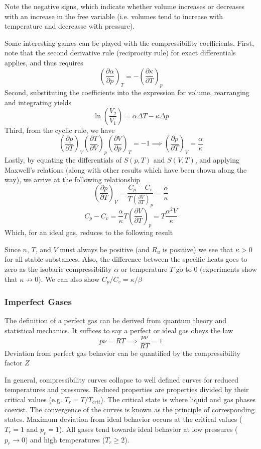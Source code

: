 \documentclass[11pt]{article}
\newcommand{\CenteredBoxed}[1]{\begin{center}\boxed{#1}\end{center}}
\newcommand{\Partial}[2]{\frac{\partial #1}{\partial #2}}
\newcommand{\PartialConst}[3]{\left(\Partial{#1}{#2}\right)_{#3}}
\begin{document}
Note the negative signs, which indicate whether volume increases or decreases with an increase in the free variable (i.e. volumes tend to increase with temperature and decreasse with pressure).

Some interesting games can be played with the compressibility coefficients. First, note that the second derivative rule (reciprocity rule) for exact differentials applies, and thus requires
$$\PartialConst{\alpha}{p}{T} = -\PartialConst{\kappa}{T}{p}$$
Second, substituting the coefficients into the expression for volume, rearranging and integrating yields
$$\ln\left(\frac{V_2}{V_1}\right) = \alpha\Delta T - \kappa\Delta p$$
Third, from the cyclic rule, we have
$$\PartialConst{p}{T}{V}\PartialConst{T}{V}{p}\PartialConst{V}{p}{T}=-1\implies\PartialConst{p}{T}{V}=\frac{\alpha}{\kappa}$$
Lastly, by equating the differentials of $S(p,T)$ and $S(V,T)$, and applying Maxwell's relations (along with other results which have been shown along the way), we arrive at the following relationship
$$\PartialConst{p}{T}{V} = \frac{C_p-C_v}{T\PartialConst{V}{T}{p}} = \frac{\alpha}{\kappa}$$
$$C_p - C_v  = \frac{\alpha}{\kappa}T\PartialConst{V}{T}{p}=T\frac{\alpha^2V}{\kappa}$$
Which, for an ideal gas, reduces to the following result
\CenteredBoxed{C_p - C_v = \frac{pV}{T} = nR_u}
Since $n$, $T$, and $V$ must always be positive (and $R_u$ is positive) we see that $\kappa>0$ for all stable substances. Also, the difference between the specific heats goes to zero as the isobaric compressibility $\alpha$ or temperature $T$ go to 0 (experiments show that $\kappa\not\to0$). We can also show $C_p/C_v=\kappa/\beta$

\subsubsection{Imperfect Gases}
The definition of a perfect gas can be derived from quantum theory and statistical mechanics. It suffices to say a perfect or ideal gas obeys the law
$$p\nu=RT\implies \frac{p\nu}{RT}=1$$
Deviation from perfect gas behavior can be quantified by the compressibility factor $Z$
\CenteredBoxed{Z=\frac{p\nu}{RT}}

In general, compressibility curves collapse to well defined curves for reduced temperatures and pressures. Reduced properties are properties divided by their critical values (e.g. $T_r = T/T_{crit}$). The critical state is where liquid and gas phases coexist. The convergence of the curves is known as the principle of corresponding states. Maximum deviation from ideal behavior occurs at the critical values ($T_r=1$ and $p_r=1$). All gases tend towards ideal behavior at low pressures ($p_r\to0$) and high temperatures ($T_r\geq2$).
\end{document}
